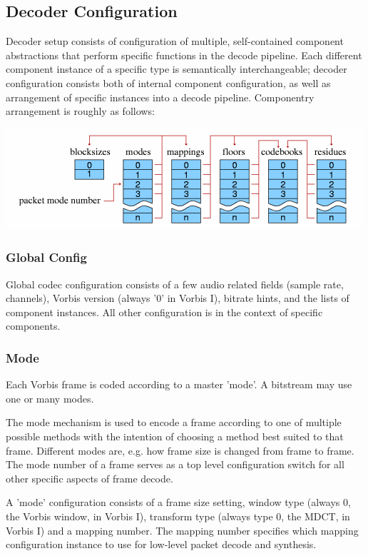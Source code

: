 \subsection{Decoder Configuration}

Decoder setup consists of configuration of multiple, self-contained
component abstractions that perform specific functions in the decode
pipeline.  Each different component instance of a specific type is
semantically interchangeable; decoder configuration consists both of
internal component configuration, as well as arrangement of specific
instances into a decode pipeline.  Componentry arrangement is roughly
as follows:

\begin{center}
\includegraphics[width=\textwidth]{components}
\end{center}

\subsubsection{Global Config}
Global codec configuration consists of a few audio related fields
(sample rate, channels), Vorbis version (always '0' in Vorbis I),
bitrate hints, and the lists of component instances.  All other
configuration is in the context of specific components.

\subsubsection{Mode}

Each Vorbis frame is coded according to a master 'mode'.  A bitstream
may use one or many modes.

The mode mechanism is used to encode a frame according to one of
multiple possible methods with the intention of choosing a method best
suited to that frame.  Different modes are, e.g. how frame size
is changed from frame to frame. The mode number of a frame serves as a
top level configuration switch for all other specific aspects of frame
decode.

A 'mode' configuration consists of a frame size setting, window type
(always 0, the Vorbis window, in Vorbis I), transform type (always
type 0, the MDCT, in Vorbis I) and a mapping number.  The mapping
number specifies which mapping configuration instance to use for
low-level packet decode and synthesis.


